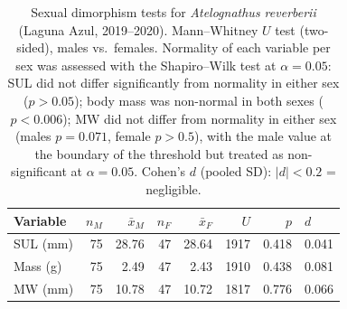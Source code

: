 \begin{table}[H]
\centering
\caption{Sexual dimorphism tests for \textit{Atelognathus reverberii}
(Laguna Azul, 2019--2020). Mann--Whitney $U$ test (two-sided), males vs.\
females. Normality of each variable per sex was assessed with the
Shapiro--Wilk test at $\alpha = 0.05$: SUL did not differ significantly
from normality in either sex ($p > 0.05$); body mass was non-normal in
both sexes ($p < 0.006$); MW did not differ from normality in either sex
(males $p = 0.071$, female $p > 0.5$), with the male value at the
boundary of the threshold but treated as non-significant at $\alpha =
0.05$. Cohen's $d$ (pooled SD): $|d| < 0.2$ = negligible.}
\label{tab:dimorphism}
\begin{tabular}{lrrrrrrl}
\toprule
Variable & $n_M$ & $\bar{x}_M$ & $n_F$ & $\bar{x}_F$ & $U$ & $p$ & $d$\\
\midrule
SUL (mm) & 75 & 28.76 & 47 & 28.64 & 1917 & 0.418 & 0.041\\
Mass (g) & 75 & 2.49 & 47 & 2.43 & 1910 & 0.438 & 0.081\\
MW (mm) & 75 & 10.78 & 47 & 10.72 & 1817 & 0.776 & 0.066\\
\bottomrule
\end{tabular}
\end{table}
